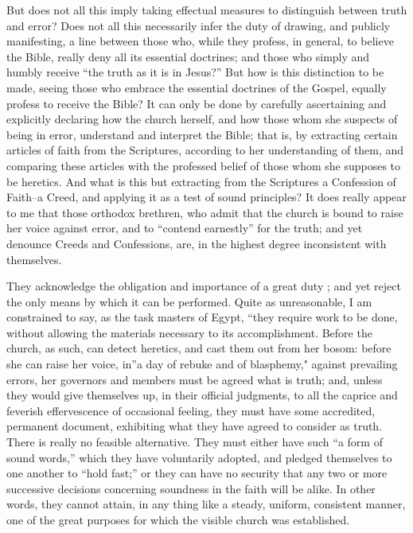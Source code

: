 \documentclass[
]{book}
\begin{document}
But does not all this imply taking effectual measures to distinguish between truth and error? Does not all this necessarily infer the duty of drawing, and publicly manifesting, a line between those who, while they profess, in general, to believe the Bible, really deny all its essential doctrines; and those who simply and humbly receive ``the truth as it is in Jesus?'' But how is this distinction to be made, seeing those who embrace the essential doctrines of the Gospel, equally profess to receive the Bible? It can only be done by carefully ascertaining and explicitly declaring how the church herself, and how those whom she suspects of being in error, understand and interpret the Bible; that is, by extracting certain articles of faith from the Scriptures, according to her understanding of them, and comparing these articles with the professed belief of those whom she supposes to be heretics. And what is this but extracting from the Scriptures a Confession of Faith--a Creed, and applying it as a test of sound principles? It does really appear to me that those orthodox brethren, who admit that the church is bound to raise her voice against error, and to ``contend earnestly'' for the truth; and yet denounce Creeds and Confessions, are, in the highest degree inconsistent with themselves.

They acknowledge the obligation and importance of a great duty ; and yet reject the only means by which it can be performed. Quite as unreasonable, I am constrained to say, as the task masters of Egypt, ``they require work to be done, without allowing the materials necessary to its accomplishment. Before the church, as such, can detect heretics, and cast them out from her bosom: before she can raise her voice, in''a day of rebuke and of blasphemy," against prevailing errors, her governors and members must be agreed what is truth; and, unless they would give themselves up, in their official judgments, to all the caprice and feverish effervescence of occasional feeling, they must have some accredited, permanent document, exhibiting what they have agreed to consider as truth. There is really no feasible alternative. They must either have such ``a form of sound words,'' which they have voluntarily adopted, and pledged themselves to one another to ``hold fast;'' or they can have no security that any two or more successive decisions concerning soundness in the faith will be alike. In other words, they cannot attain, in any thing like a steady, uniform, consistent manner, one of the great purposes for which the visible church was established.
\end{document}
